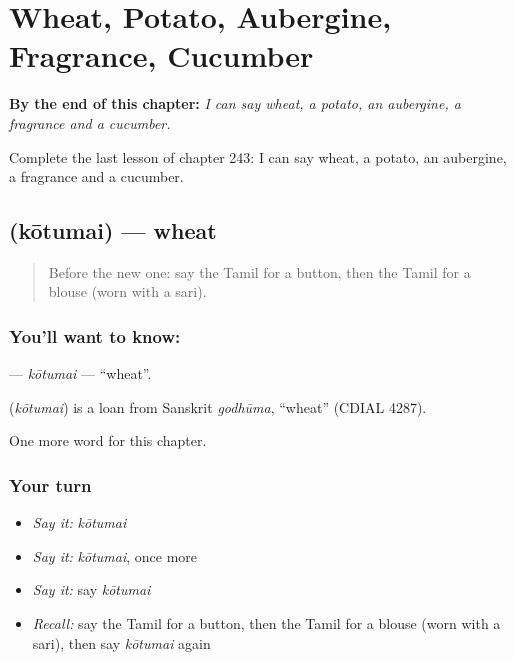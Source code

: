 
\chapter{Wheat, Potato, Aubergine, Fragrance, Cucumber}
\label{ch:ta-wheat-potato-aubergine-fragrance-cucumber}

\begin{chapteropening}
\textbf{By the end of this chapter:} \emph{I can say wheat, a potato, an aubergine, a fragrance and a cucumber.}

Complete the last lesson of chapter 243: I can say wheat, a potato, an aubergine, a fragrance and a cucumber.
\end{chapteropening}

\section[\texorpdfstring{\ta{கோதுமை} (kōtumai)}{கோதுமை (kōtumai)}]{ (kōtumai) — wheat}

\label{lesson:TA-C243-kotumai}



\begin{quote}
Before the new one: say the Tamil for a button, then the Tamil for a blouse (worn with a sari).
\end{quote}

\subsection*{You'll want to know: }
\textbf{} — \emph{kōtumai} — \textquotedblleft{}wheat\textquotedblright{}.

\begin{cousinweb}
\textbf{} (\emph{kōtumai}) is a loan from Sanskrit \emph{godhūma}, \textquotedblleft{}wheat\textquotedblright{} (CDIAL 4287).
\end{cousinweb}

\begin{grammarlens}[title={What you've built}]
One more word for this chapter.
\end{grammarlens}

\subsection*{Your turn}
\begin{itemize}
\raggedright
  \item \emph{Say it:} \emph{kōtumai}
  \item \emph{Say it:} \emph{kōtumai}, once more
  \item \emph{Say it:} say \emph{kōtumai}
  \item \emph{Recall:} say the Tamil for a button, then the Tamil for a blouse (worn with a sari), then say \emph{kōtumai} again
\end{itemize}

